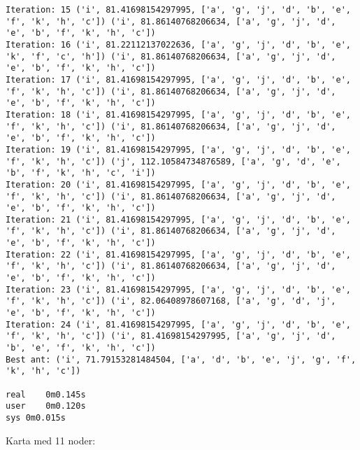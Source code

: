 \documentclass[english,man]{apa6}
\begin{document}
\begin{verbatim}
Iteration: 15 ('i', 81.41698154297995, ['a', 'g', 'j', 'd', 'b', 'e', 'f', 'k', 'h', 'c']) ('i', 81.86140768206634, ['a', 'g', 'j', 'd', 'e', 'b', 'f', 'k', 'h', 'c'])
Iteration: 16 ('i', 81.22112137022636, ['a', 'g', 'j', 'd', 'b', 'e', 'k', 'f', 'c', 'h']) ('i', 81.86140768206634, ['a', 'g', 'j', 'd', 'e', 'b', 'f', 'k', 'h', 'c'])
Iteration: 17 ('i', 81.41698154297995, ['a', 'g', 'j', 'd', 'b', 'e', 'f', 'k', 'h', 'c']) ('i', 81.86140768206634, ['a', 'g', 'j', 'd', 'e', 'b', 'f', 'k', 'h', 'c'])
Iteration: 18 ('i', 81.41698154297995, ['a', 'g', 'j', 'd', 'b', 'e', 'f', 'k', 'h', 'c']) ('i', 81.86140768206634, ['a', 'g', 'j', 'd', 'e', 'b', 'f', 'k', 'h', 'c'])
Iteration: 19 ('i', 81.41698154297995, ['a', 'g', 'j', 'd', 'b', 'e', 'f', 'k', 'h', 'c']) ('j', 112.10584734876589, ['a', 'g', 'd', 'e', 'b', 'f', 'k', 'h', 'c', 'i'])
Iteration: 20 ('i', 81.41698154297995, ['a', 'g', 'j', 'd', 'b', 'e', 'f', 'k', 'h', 'c']) ('i', 81.86140768206634, ['a', 'g', 'j', 'd', 'e', 'b', 'f', 'k', 'h', 'c'])
Iteration: 21 ('i', 81.41698154297995, ['a', 'g', 'j', 'd', 'b', 'e', 'f', 'k', 'h', 'c']) ('i', 81.86140768206634, ['a', 'g', 'j', 'd', 'e', 'b', 'f', 'k', 'h', 'c'])
Iteration: 22 ('i', 81.41698154297995, ['a', 'g', 'j', 'd', 'b', 'e', 'f', 'k', 'h', 'c']) ('i', 81.86140768206634, ['a', 'g', 'j', 'd', 'e', 'b', 'f', 'k', 'h', 'c'])
Iteration: 23 ('i', 81.41698154297995, ['a', 'g', 'j', 'd', 'b', 'e', 'f', 'k', 'h', 'c']) ('i', 82.06408978607168, ['a', 'g', 'd', 'j', 'e', 'b', 'f', 'k', 'h', 'c'])
Iteration: 24 ('i', 81.41698154297995, ['a', 'g', 'j', 'd', 'b', 'e', 'f', 'k', 'h', 'c']) ('i', 81.41698154297995, ['a', 'g', 'j', 'd', 'b', 'e', 'f', 'k', 'h', 'c'])
Best ant: ('i', 71.79153281484504, ['a', 'd', 'b', 'e', 'j', 'g', 'f', 'k', 'h', 'c'])

real    0m0.145s
user    0m0.120s
sys 0m0.015s
\end{verbatim}

Karta med 11 noder:
\end{document}
